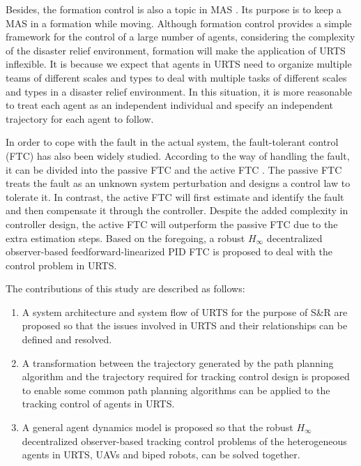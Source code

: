 \documentclass{ieeeaccess}
\begin{document}
Besides, the formation control is also a topic in MAS \cite{wang2022consensus}. Its purpose is to keep a MAS in a formation while moving. Although formation control provides a simple framework for the control of a large number of agents, considering the complexity of the disaster relief environment, formation will make the application of URTS inflexible. It is because we expect that agents in URTS need to organize multiple teams of different scales and types to deal with multiple tasks of different scales and types in a disaster relief environment. In this situation, it is more reasonable to treat each agent as an independent individual and specify an independent trajectory for each agent to follow.

In order to cope with the fault in the actual system, the fault-tolerant control (FTC) has also been widely studied. According to the way of handling the fault, it can be divided into the passive FTC and the active FTC \cite{6669235}. The passive FTC treats the fault as an unknown system perturbation and designs a control law to tolerate it. In contrast, the active FTC will first estimate and identify the fault and then compensate it through the controller. Despite the added complexity in controller design, the active FTC will outperform the passive FTC due to the extra estimation steps. Based on the foregoing, a robust $H_\infty$ decentralized observer-based feedforward-linearized PID FTC is proposed to deal with the control problem in URTS.

The contributions of this study are described as follows:
\begin{enumerate}
    \item A system architecture and system flow of URTS for the purpose of S\&R are proposed so that the issues involved in URTS and their relationships can be defined and resolved.
    \item A transformation between the trajectory generated by the path planning algorithm and the trajectory required for tracking control design is proposed to enable some common path planning algorithms can be applied to the tracking control of agents in URTS.
    \item A general agent dynamics model is proposed so that the robust $H_\infty$ decentralized observer-based tracking control problems of the heterogeneous agents in URTS, UAVs and biped robots, can be solved together.
\end{enumerate}
\end{document}
